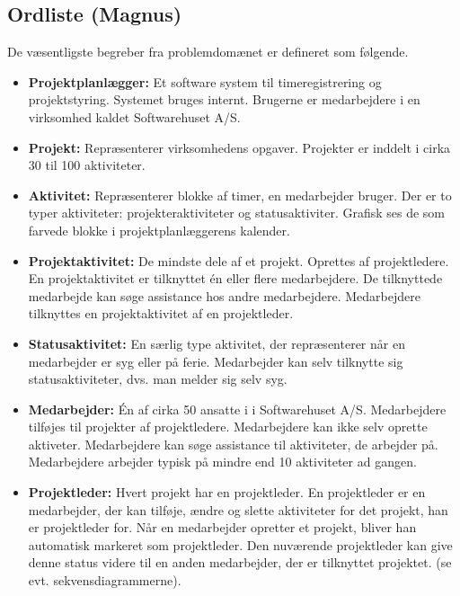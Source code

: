 \subsection{Ordliste (Magnus)}

De væsentligste begreber fra problemdomænet er defineret som følgende.

\begin{itemize}
\item \textbf{Projektplanlægger:} Et software system til timeregistrering og projektstyring. Systemet bruges internt. Brugerne er medarbejdere i en virksomhed kaldet Softwarehuset A/S.

\item \textbf{Projekt:} Repræsenterer virksomhedens opgaver. Projekter er inddelt i cirka 30 til 100 aktiviteter.

\item \textbf{Aktivitet:} Repræsenterer blokke af timer, en medarbejder bruger. Der er to typer aktiviteter: projekteraktiviteter og statusaktiviter. Grafisk ses de som farvede blokke i projektplanlæggerens kalender.

\item \textbf{Projektaktivitet:} De mindste dele af et projekt. Oprettes af projektledere. En projektaktivitet er tilknyttet én eller flere medarbejdere. De tilknyttede medarbejde kan søge assistance hos andre medarbejdere. Medarbejdere tilknyttes en projektaktivitet af en projektleder.

\item \textbf{Statusaktivitet:} En særlig type aktivitet, der repræsenterer når en medarbejder er syg eller på ferie. Medarbejder kan selv tilknytte sig statusaktiviteter, dvs. man melder sig selv syg.

\item \textbf{Medarbejder:} Én af cirka 50 ansatte i i Softwarehuset A/S. Medarbejdere tilføjes til projekter af projektledere. Medarbejdere kan ikke selv oprette aktiveter. Medarbejdere kan søge assistance til aktiviteter, de arbejder på. Medarbejdere arbejder typisk på mindre end 10 aktiviteter ad gangen.

\item \textbf{Projektleder:} Hvert projekt har en projektleder. En projektleder er en medarbejder, der kan tilføje, ændre og slette aktiviteter for det projekt, han er projektleder for. Når en medarbejder opretter et projekt, bliver han automatisk markeret som projektleder. Den nuværende projektleder kan give denne status videre til en anden medarbejder, der er tilknyttet projektet. (se evt. sekvensdiagrammerne).

\end{itemize}


